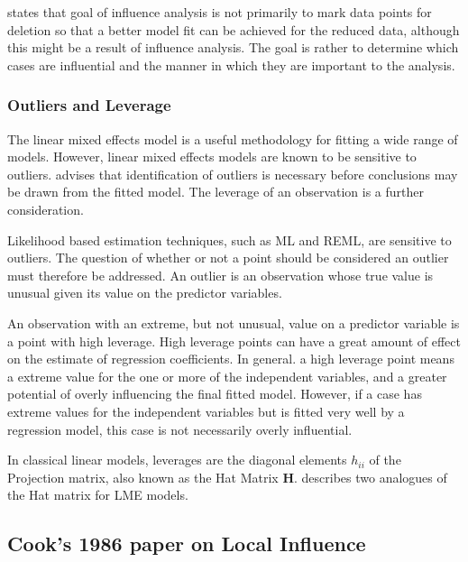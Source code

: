 \documentclass[12pt, a4paper]{report}
\theoremstyle{plain}
\theoremstyle{definition}
\theoremstyle{remark}
\begin{document}
	
	\citet{schabenberger} states that goal of influence analysis is not primarily to mark data
	points for deletion so that a better model fit can be achieved for the reduced data, although this might be a
	result of influence analysis. The goal is rather to determine which cases are influential and the manner in
	which they are important to the analysis. 
	
	
	
	
\subsubsection{Outliers and Leverage}
The linear mixed effects model is a useful methodology for fitting a wide range of models. However, linear mixed effects models are known to be sensitive to outliers. \citet{Christensen} advises that identification of outliers is necessary before conclusions may be drawn from the fitted model. The leverage of an observation is a further consideration. 
	
Likelihood based estimation techniques, such as ML and REML, are sensitive to outliers. The question of whether or not a point should be considered an outlier must therefore be addressed. An outlier is an observation whose true value is unusual given its value on the predictor variables.

An observation with an extreme, but not unusual, value on a predictor variable is a point with high leverage. High leverage points can have a great amount of effect on the estimate of regression coefficients. In general. a high leverage point means a extreme value for the one or more of the independent variables, and a greater potential of
overly influencing the final fitted model. However, if a case has  extreme values for the independent variables but is fitted very well by a regression model, this case is not necessarily overly influential.

In classical linear models, leverages are the diagonal elements $h_{ii}$ of the Projection matrix, also known as the Hat Matrix $\boldsymbol{H}$. \citet{schabenberger} describes two analogues of the Hat matrix for LME models.


	

\subsection{Cook's 1986 paper on Local Influence}%
\end{document}
